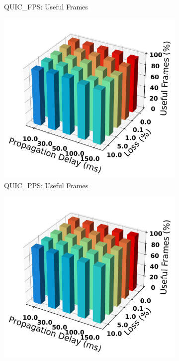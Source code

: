 \documentclass{mpaper}
\begin{document}
\begin{figure}
\begin{subfigure}[b]{0.25\textwidth}
      \caption{QUIC\_FPS: Useful Frames}
      \label{fig:FPS_bar-168}
  \end{subfigure}
  \hfill
  \begin{subfigure}[b]{0.25\textwidth}
      \centering
      \includegraphics[width=\textwidth]{Frame_Usefulness_Ratio/QUIC_PPS/AVG_Frame_Usefulness-168.png}
      \caption{QUIC\_PPS: Useful Frames}
      \label{fig:PPS_bar-168}
  \end{subfigure}
  \hfill
  \begin{subfigure}[b]{0.25\textwidth}
      \centering
      \includegraphics[width=\textwidth]{Frame_Usefulness_Ratio/UDP/AVG_Frame_Usefulness-168.png}

\end{subfigure}
\end{figure}
\end{document}
